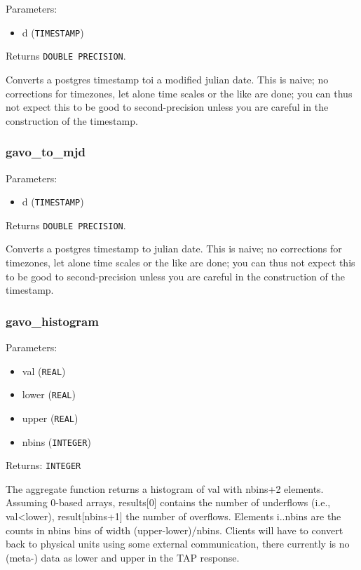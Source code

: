 \documentclass[11pt,a4paper]{ivoa}
\begin{document}
Parameters:

\begin{itemize}
	\item d (\texttt{TIMESTAMP})
\end{itemize}

Returns \texttt{DOUBLE PRECISION}.

Converts a postgres timestamp toi a modified julian date. This is naive;
no corrections for timezones, let alone time scales or the like are done;
you can thus not expect this to be good to second-precision unless you
are careful in the construction of the timestamp.

\subsubsection{gavo\_to\_mjd}

Parameters:

\begin{itemize}
	\item d (\texttt{TIMESTAMP})
\end{itemize}

Returns \texttt{DOUBLE PRECISION}.

Converts a postgres timestamp to julian date. This is naive; no
corrections for timezones, let alone time scales or the like are done;
you can thus not expect this to be good to second-precision unless you
are careful in the construction of the timestamp.

\subsubsection{gavo\_histogram}

Parameters:

\begin{itemize}
	\item val (\texttt{REAL})
	\item lower (\texttt{REAL})
	\item upper (\texttt{REAL})
	\item nbins (\texttt{INTEGER})
\end{itemize}

Returns: \texttt{INTEGER\[\]}

The aggregate function returns a histogram of val with nbins+2 elements.
Assuming 0-based arrays, results[0] contains the number of underflows
(i.e., val<lower), result[nbins+1] the number of overflows. Elements
i..nbins are the counts in nbins bins of width (upper-lower)/nbins.
Clients will have to convert back to physical units using some external
communication, there currently is no (meta-) data as lower and upper in
the TAP response.
\end{document}
